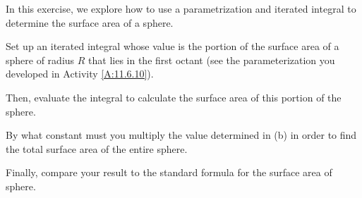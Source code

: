 \begin{exercises}
  \item In this exercise, we explore how to use a parametrization and iterated integral to determine the surface area of a sphere.
  \ba
  	\item Set up an iterated integral whose value is the portion of the surface area of a sphere of radius $R$ that lies in the first octant (see the parameterization you developed in Activity \ref{A:11.6.10}). 
	\item Then, evaluate the integral to calculate the surface area of this portion of the sphere.
	\item By what constant must you multiply the value determined in (b) in order to find the total surface area of the entire sphere.  	
\item Finally, compare your result to the standard formula for the surface area of sphere. 
  \ea


\end{exercises}
